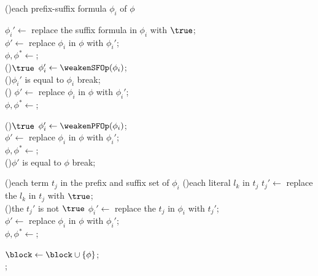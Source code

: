 \begin{algorithm}[h]
    \caption{}\label{alg:abstact}

    \For(){each prefix-suffix formula $\phi_i$ of $\phi$}{
        $\phi_i' \gets$ replace the suffix formula in $\phi_i$ with $\true$;\\
        $\phi' \gets$ replace $\phi_i$ in $\phi$ with $\phi_i'$;\\ 
        $\phi,\phi^* \gets$;\\

        \While(){$\true$}{
            $\phi_i' \gets \weakenSFOp(\phi_i)$;\\
            \If(){$\phi_i'$ is equal to $\phi_i$}{
                break;\\
            }
            \Else(){
                $\phi' \gets$ replace $\phi_i$ in $\phi$ with $\phi_i'$;\\ 
                $\phi,\phi^* \gets$;\\
            }
        }

        \While(){$\true$}{
            $\phi_i' \gets \weakenPFOp(\phi_i)$;\\
            $\phi' \gets$ replace $\phi_i$ in $\phi$ with $\phi_i'$;\\ 
            $\phi,\phi^* \gets$;\\
            \If(){$\phi'$ is equal to $\phi$}{
                break;\\
            }
        }

        \For(){each term $t_j$ in the prefix and suffix set of $\phi_i$}{
            \For(){each literal $l_k$ in $t_j$}{
                $t_j' \gets$ replace the $l_k$ in $t_j$ with $\true$;\\
                \If(){the $t_j'$ is not $\true$}{
                    $\phi_i' \gets$ replace the $t_j$ in $\phi_i$ with $t_j'$;\\
                    $\phi' \gets$ replace $\phi_i$ in $\phi$ with $\phi_i'$;\\
                    $\phi,\phi^* \gets$;\\
                }
            }
        }
    }
    $\block \gets \block \cup \{\phi\}$;\\
    \Return{$\phi^*,\block$};\\
\end{algorithm}
